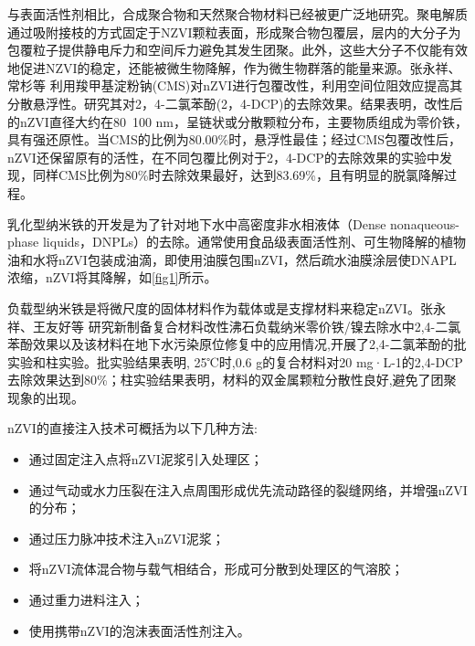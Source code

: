 与表面活性剂相比，合成聚合物和天然聚合物材料已经被更广泛地研究\cite{ZHOU2014155}。聚电解质通过吸附接枝的方式固定于NZVI颗粒表面，形成聚合物包覆层，层内的大分子为包覆粒子提供静电斥力和空间斥力\cite{2018Impact,doi:10.108007388551.2018.1440525}避免其发生团聚。此外，这些大分子不仅能有效地促进NZVI的稳定，还能被微生物降解，作为微生物群落的能量来源。张永祥、常杉等\cite{11} 利用羧甲基淀粉钠(CMS)对nZVI进行包覆改性，利用空间位阻效应提高其分散悬浮性。研究其对2，4-二氯苯酚(2，4-DCP)的去除效果。结果表明，改性后的nZVI直径大约在80~100 nm，呈链状或分散颗粒分布，主要物质组成为零价铁，具有强还原性。当CMS的比例为80.00\%时，悬浮性最佳；经过CMS包覆改性后，nZVI还保留原有的活性，在不同包覆比例对于2，4-DCP的去除效果的实验中发现，同样CMS比例为80\%时去除效果最好，达到83.69\%，且有明显的脱氯降解过程。

乳化型纳米铁的开发是为了针对地下水中高密度非水相液体（Dense nonaqueous-phase liquids，DNPLs）的去除。通常使用食品级表面活性剂、可生物降解的植物油和水将nZVI包装成油滴，即使用油膜包围nZVI，然后疏水油膜涂层使DNAPL浓缩，nZVI将其降解\cite{12}，如\cref{fig1}所示。

负载型纳米铁是将微尺度的固体材料作为载体或是支撑材料来稳定nZVI。张永祥、王友好等\cite{13, 14} 研究新制备复合材料改性沸石负载纳米零价铁/镍去除水中2,4-二氯苯酚效果以及该材料在地下水污染原位修复中的应用情况,开展了2,4-二氯苯酚的批实验和柱实验。批实验结果表明, 25℃时,0.6 g的复合材料对20 mg·L-1的2,4-DCP去除效果达到80\%；柱实验结果表明，材料的双金属颗粒分散性良好,避免了团聚现象的出现。


nZVI的直接注入技术可概括为以下几种方法:

\begin{itemize}
    \item 通过固定注入点将nZVI泥浆引入处理区\cite{17}；
    \item 通过气动或水力压裂在注入点周围形成优先流动路径的裂缝网络，并增强nZVI的分布\cite{18}；
    \item 通过压力脉冲技术注入nZVI泥浆；
    \item 将nZVI流体混合物与载气相结合，形成可分散到处理区的气溶胶\cite{19}；
    \item 通过重力进料注入\cite{20}；
    \item 使用携带nZVI的泡沫表面活性剂注入\cite{21}。
\end{itemize}

